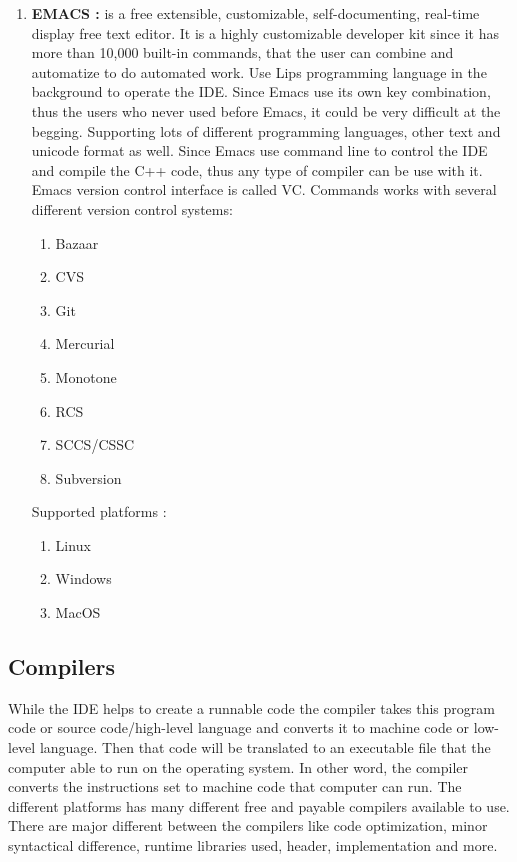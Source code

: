 \documentclass[12pt]{article}
\begin{document}
{\begin{enumerate}
Supported platforms : 
\begin{enumerate}
\item Linux
\item Windows
\item MacOS
\end{enumerate}

\item \textbf{EMACS : } is a free extensible, customizable, self-documenting, real-time display free text editor. It is a highly customizable developer kit since it has more than 10,000 built-in commands, that the user can combine and automatize to do automated work. Use Lips programming language in the background to operate the IDE. Since Emacs use its own key combination, thus the users who never used before Emacs, it could be very difficult at the begging. Supporting lots of different programming languages, other text and unicode format as well. Since Emacs use command line to control the IDE and compile the C++ code, thus any type of compiler can be use with it.\cite{Emacs}\\

Emacs version control interface is called VC. Commands works with several different version control systems:
\begin{enumerate}
\item Bazaar
\item CVS
\item Git
\item Mercurial
\item Monotone
\item RCS
\item SCCS/CSSC
\item Subversion
\end{enumerate} 

Supported platforms : 
\begin{enumerate}
\item Linux
\item Windows
\item MacOS
\end{enumerate}

\end{enumerate}
}

\subsection{Compilers}
While the IDE helps to create a runnable code the compiler takes this program code or source code/high-level language and converts it to machine code or low-level language. Then that code will be translated to an executable file that the computer able to run on the operating system. In other word, the compiler converts the instructions set to machine code that computer can run. The different platforms has many different free and payable compilers available to use. There are  major different between the compilers like code optimization, minor syntactical difference, runtime libraries used, header, implementation and more.\cite{Bolton}\\
\end{document}
